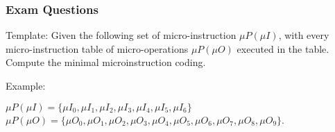 \begin{frame}
    \frametitle{Exam Questions}
    Template: Given the following set of micro-instruction $\mu P(\mu I)$, with every micro-instruction table of micro-operations $\mu P(\mu O)$ executed in the table. Compute the minimal microinstruction coding.

    Example:

    $\mu P(\mu I) = \{ \mu I_{0}, \mu I_{1}, \mu I_{2}, \mu I_{3}, \mu I_{4}, \mu I_{5}, \mu I_{6}\}$
    $\mu P(\mu O) = \{ \mu O_{0}, \mu O_{1}, \mu O_{2}, \mu O_{3}, \mu O_{4}, \mu O_{5}, \mu O_{6}, \mu O_{7}, \mu O_{8}, \mu O_{9}\}$.
    \begin{table}
    \end{table}
\end{frame}

